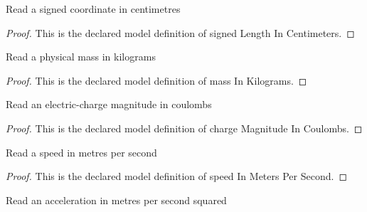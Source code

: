 \begin{definition}
  \label{def:physics:phyx-mini-0927:phyxminiproblems-problemphyxmini0927-signedlengthincentimeters}
  Read a signed coordinate in centimetres
\end{definition}
\begin{proof}
  This is the declared model definition of signed Length In Centimeters.
\end{proof}
\begin{definition}
  \label{def:physics:phyx-mini-0927:phyxminiproblems-problemphyxmini0927-massinkilograms}
  Read a physical mass in kilograms
\end{definition}
\begin{proof}
  This is the declared model definition of mass In Kilograms.
\end{proof}
\begin{definition}
  \label{def:physics:phyx-mini-0927:phyxminiproblems-problemphyxmini0927-chargemagnitudeincoulombs}
  Read an electric-charge magnitude in coulombs
\end{definition}
\begin{proof}
  This is the declared model definition of charge Magnitude In Coulombs.
\end{proof}
\begin{definition}
  \label{def:physics:phyx-mini-0927:phyxminiproblems-problemphyxmini0927-speedinmeterspersecond}
  Read a speed in metres per second
\end{definition}
\begin{proof}
  This is the declared model definition of speed In Meters Per Second.
\end{proof}
\begin{definition}
  \label{def:physics:phyx-mini-0927:phyxminiproblems-problemphyxmini0927-accelerationinmeterspersecondsquared}
  Read an acceleration in metres per second squared
\end{definition}
